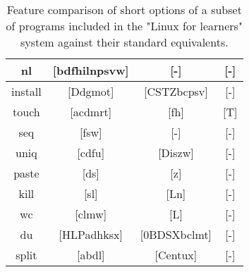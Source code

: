 \begin{table}[H]
\begin{center}
\begin{tabular}{|c|c|c|c|}
            \hline
            nl & [bdfhilnpsvw] & [-] & [-] \\
            \hline
            install & [Ddgmot] & [CSTZbcpsv] & [-] \\
            \hline
            touch & [acdmrt] & [fh] & [T] \\
            \hline
            seq & [fsw] & [-] & [-] \\
            \hline
            uniq & [cdfu] & [Diszw] & [-] \\
            \hline
            paste & [ds] & [z] & [-] \\
            \hline
            kill & [sl] & [Ln] & [-] \\ 
            \hline
            wc & [clmw] & [L] & [-] \\
            \hline
            du & [HLPadhksx] & [0BDSXbclmt] & [-] \\
            \hline
            split & [abdl] & [Centux] & [-] \\
            \hline
        \end{tabular}
    \end{center}
    \caption{Feature comparison of short options of a subset of programs included in the "Linux for learners" system against their standard equivalents.}
\end{table}
